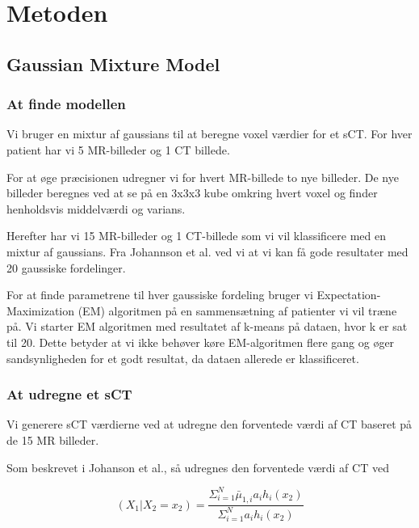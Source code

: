 \section{Metoden}
\subsection{Gaussian Mixture Model}

\subsubsection{At finde modellen}
Vi bruger en mixtur af gaussians til at beregne voxel værdier
for et sCT. For hver patient har vi 5 MR-billeder og 1 CT billede.

For at øge præcisionen udregner vi for hvert MR-billede
to nye billeder. De nye billeder beregnes ved at se på en 3x3x3
kube omkring hvert voxel og finder henholdsvis middelværdi og varians.

Herefter har vi 15 MR-billeder og 1 CT-billede som vi vil klassificere
med en mixtur af gaussians. Fra Johannson et al. ved vi at vi kan få
gode resultater med 20 gaussiske fordelinger. 

For at finde parametrene til hver gaussiske fordeling bruger vi
Expectation-Maximization (EM) algoritmen på en sammensætning af patienter
vi vil træne på. Vi starter EM algoritmen med resultatet af k-means på
dataen, hvor k er sat til 20. Dette betyder at vi ikke behøver køre
EM-algoritmen flere gang og øger sandsynligheden for et godt resultat, da
dataen allerede er klassificeret.




\subsubsection{At udregne et sCT}

Vi generere sCT værdierne ved at udregne den forventede værdi af CT baseret på de 15 MR billeder. 

Som beskrevet i Johanson et al., så udregnes den forventede værdi af CT ved

\begin{equation}
(X_1 | X_2 = x_2) = \frac{\Sigma^{N}_{i=1} \bar{\mu}_{1,i} a_i h_i(x_2)}{\Sigma^{N}_{i=1} a_i h_i(x_2)}
\end{equation}


